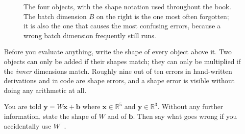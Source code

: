 \begin{figure}[htbp]
\centering
{}
\caption{The four objects, with the shape notation used throughout the book.
The batch dimension $B$ on the right is the one most often forgotten; it is
also the one that causes the most confusing errors, because a wrong batch
dimension frequently still runs.}
\label{fig:math-four-objects}
\end{figure}

\begin{engineernote}
Before you evaluate anything, write the shape of every object above it. Two
objects can only be added if their shapes match; they can only be multiplied if
the \emph{inner} dimensions match. Roughly nine out of ten errors in
hand-written derivations and in code are shape errors, and a shape error is
visible without doing any arithmetic at all.
\end{engineernote}

\begin{checkpoint}
You are told $\mathbf{y} = W\mathbf{x} + \mathbf{b}$ where
$\mathbf{x}\in\mathbb{R}^{5}$ and $\mathbf{y}\in\mathbb{R}^{3}$. Without any
further information, state the shape of $W$ and of $\mathbf{b}$. Then say what
goes wrong if you accidentally use $W^{\!\top}$.
\end{checkpoint}

